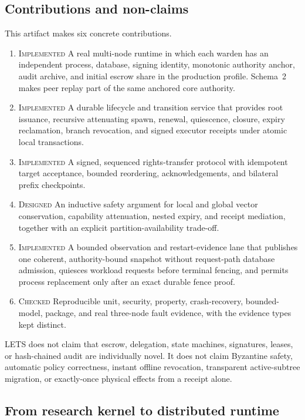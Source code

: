 \documentclass[10pt]{article}
\newcommand{\LETS}{\textsc{LETS}}
\newcommand{\impl}{\textsc{Implemented}}
\newcommand{\checked}{\textsc{Checked}}
\newcommand{\designed}{\textsc{Designed}}
\begin{document}
\subsection{Contributions and non-claims}

This artifact makes six concrete contributions.

\begin{enumerate}
  \item \impl{} A real multi-node runtime in which each warden has an independent process,
  database, signing identity, monotonic authority anchor, audit archive, and initial escrow share
  in the production profile. Schema~2 makes peer replay part of the same anchored core authority.
  \item \impl{} A durable lifecycle and transition service that provides root issuance, recursive
  attenuating spawn, renewal, quiescence, closure, expiry reclamation, branch revocation, and
  signed executor receipts under atomic local transactions.
  \item \impl{} A signed, sequenced rights-transfer protocol with idempotent target acceptance,
  bounded reordering, acknowledgements, and bilateral prefix checkpoints.
  \item \designed{} An inductive safety argument for local and global vector conservation,
  capability attenuation, nested expiry, and receipt mediation, together with an explicit
  partition-availability trade-off.
  \item \impl{} A bounded observation and restart-evidence lane that publishes one coherent,
  authority-bound snapshot without request-path database admission, quiesces workload requests
  before terminal fencing, and permits process replacement only after an exact durable fence proof.
  \item \checked{} Reproducible unit, security, property, crash-recovery, bounded-model, package,
  and real three-node fault evidence, with the evidence types kept distinct.
\end{enumerate}

\LETS{} does not claim that escrow, delegation, state machines, signatures, leases, or
hash-chained audit are individually novel. It does not claim Byzantine safety, automatic policy
correctness, instant offline revocation, transparent active-subtree migration, or exactly-once
physical effects from a receipt alone.

\subsection{From research kernel to distributed runtime}
\end{document}
